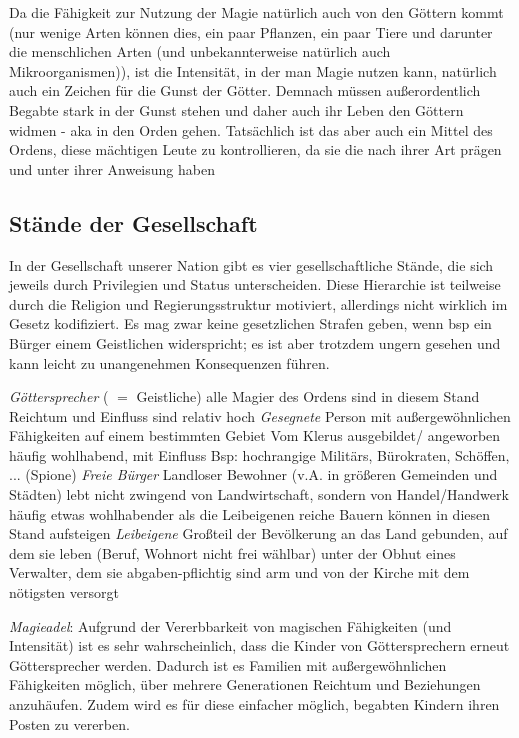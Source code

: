 Da die Fähigkeit zur Nutzung der Magie natürlich auch von den Göttern kommt (nur wenige Arten können dies, ein paar Pflanzen, ein paar Tiere und darunter die menschlichen Arten (und unbekannterweise natürlich auch Mikroorganismen)), ist die Intensität, in der man Magie nutzen kann, natürlich auch ein Zeichen für die Gunst der Götter. 
Demnach müssen außerordentlich Begabte stark in der Gunst stehen und daher auch ihr Leben den Göttern widmen - aka in den Orden gehen. 
Tatsächlich ist das aber auch ein Mittel des Ordens, diese mächtigen Leute zu kontrollieren, da sie die nach ihrer Art prägen und unter ihrer Anweisung haben

\subsection{Stände der Gesellschaft}\label{ch:staende}
In der Gesellschaft unserer Nation gibt es vier gesellschaftliche Stände, die sich jeweils durch Privilegien und Status unterscheiden. 
Diese Hierarchie ist teilweise durch die Religion und Regierungsstruktur motiviert, allerdings nicht wirklich im Gesetz kodifiziert. Es mag zwar keine gesetzlichen Strafen geben, 
wenn bsp ein Bürger einem Geistlichen widerspricht; es ist aber trotzdem ungern gesehen und kann leicht zu unangenehmen Konsequenzen führen.
\begin{outline}
	\1 \emph{Göttersprecher} ( $=$ Geistliche)
		\2 alle Magier des Ordens sind in diesem Stand
		\2 Reichtum und Einfluss sind relativ hoch 
	\1 \emph{Gesegnete}
		\2 Person mit außergewöhnlichen Fähigkeiten auf einem bestimmten Gebiet
		\2 Vom Klerus ausgebildet/ angeworben
		\2 häufig wohlhabend, mit Einfluss
		\2 Bsp: hochrangige Militärs, Bürokraten, Schöffen,  ... (Spione)
	\1 \emph{Freie Bürger}
		\2 Landloser Bewohner (v.A. in größeren Gemeinden und Städten)
		\2 lebt nicht zwingend von Landwirtschaft, sondern von Handel/Handwerk
		\2 häufig etwas wohlhabender als die Leibeigenen
		\2 reiche Bauern können in diesen Stand aufsteigen
	\1 \emph{Leibeigene}
		\2 Großteil der Bevölkerung
		\2 an das Land gebunden, auf dem sie leben (Beruf, Wohnort nicht frei wählbar)
		\2 unter der Obhut eines Verwalter, dem sie abgaben-pflichtig sind
		\2 arm und von der Kirche mit dem nötigsten versorgt
\end{outline}

\emph{Magieadel}: Aufgrund der Vererbbarkeit von magischen Fähigkeiten (und Intensität) ist es sehr wahrscheinlich, dass die Kinder von Göttersprechern erneut Göttersprecher werden. 
Dadurch ist es Familien mit außergewöhnlichen Fähigkeiten möglich, über mehrere Generationen Reichtum und Beziehungen anzuhäufen. 
Zudem wird es für diese einfacher möglich, begabten Kindern ihren Posten zu vererben.



